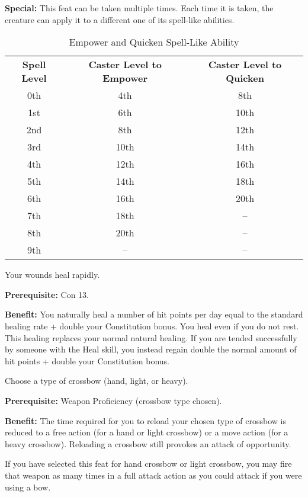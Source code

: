 \textbf{Special:} This feat can be taken multiple times. Each time it is taken, 
the creature can apply it to a different one of its spell-like abilities.

\begin{table}[htb]
\caption{Empower and Quicken Spell-Like Ability}
\centering
\begin{tabular}{c c c}
\textbf{Spell Level} & \textbf{Caster Level to Empower} & \textbf{Caster Level to Quicken}\\
0th & 4th & 8th\\
1st & 6th & 10th\\
2nd & 8th & 12th\\
3rd & 10th & 14th\\
4th & 12th & 16th\\
5th & 14th & 18th\\
6th & 16th & 20th\\
7th & 18th & --\\
8th & 20th & --\\
9th & -- & --\\
\end{tabular}
\end{table}


Your wounds heal rapidly.

\textbf{Prerequisite:} Con 13.

\textbf{Benefit:} You naturally heal a number of hit points per day equal to the 
standard healing rate + double your Constitution  bonus. You heal even if you do 
not rest. This healing replaces your normal natural healing. If you are tended 
successfully by someone with the Heal skill, you instead regain double the normal 
amount of hit points + double your Constitution bonus.


Choose a type of crossbow (hand, light, or heavy).

\textbf{Prerequisite:} Weapon Proficiency (crossbow type chosen).

\textbf{Benefit:} The time required for you to reload your chosen type of crossbow 
is reduced to a free action (for a hand or light crossbow) or a move action (for 
a heavy crossbow). Reloading a crossbow still provokes an attack of opportunity.

If you have selected this feat for hand crossbow or light crossbow, you may fire 
that weapon as many times in a full attack action as you could attack if you were 
using a bow.

